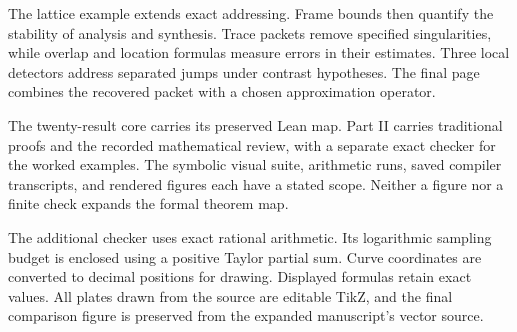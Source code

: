 \documentclass[11pt,letterpaper]{article}
\newcommand{\head}[1]{\par\vspace{2pt}{\sffamily\bfseries\normalsize #1}\par\vspace{1pt}}
\begin{document}
\head{A connected route}
The lattice example extends exact addressing. Frame bounds then quantify the
stability of analysis and synthesis. Trace packets remove specified singularities,
while overlap and location formulas measure errors in their estimates. Three
local detectors address separated jumps under contrast hypotheses. The final
page combines the recovered packet with a chosen approximation operator.
\head{Keep the evidence attached to its claim}
The twenty-result core carries its preserved Lean map. Part II carries
traditional proofs and the recorded mathematical review, with a separate exact
checker for the worked examples. The symbolic visual suite, arithmetic
runs, saved compiler transcripts, and rendered figures each have a stated
scope. Neither a figure nor a finite check expands the formal theorem map.
\head{What the example numbers mean}
The additional checker uses exact rational arithmetic. Its logarithmic sampling
budget is enclosed using a positive Taylor partial sum. Curve coordinates are
converted to decimal positions for drawing. Displayed formulas retain exact
values. All plates drawn from the source are editable TikZ, and the final comparison
figure is preserved from the expanded manuscript's vector source.

\clearpage
{}
\begingroup
{}\fontsize{10}{12}\selectfont
\setlength{\parskip}{3pt}\setlength{\abovedisplayskip}{6pt}\setlength{\belowdisplayskip}{6pt}

\endgroup
\end{document}
